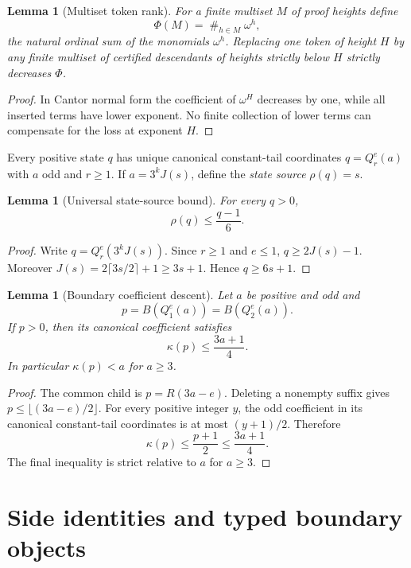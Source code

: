\documentclass[11pt]{article}
\newtheorem{lemma}[theorem]{Lemma}
\begin{document}
\begin{lemma}[Multiset token rank]\label{lem:token-rank}
For a finite multiset $M$ of proof heights define
\[
  \Phi(M)=\mathop{\#}_{h\in M}\omega^h,
\]
the natural ordinal sum of the monomials $\omega^h$. Replacing one token of
height $H$ by any finite multiset of certified descendants of heights strictly
below $H$ strictly decreases $\Phi$.
\end{lemma}

\begin{proof}
In Cantor normal form the coefficient of $\omega^H$ decreases by one, while
all inserted terms have lower exponent. No finite collection of lower terms
can compensate for the loss at exponent $H$.
\end{proof}

Every positive state $q$ has unique canonical constant-tail coordinates
$q=Q_r^e(a)$ with $a$ odd and $r\ge1$. If
$a=3^kJ(s)$, define the \emph{state source} $\rho(q)=s$.

\begin{lemma}[Universal state-source bound]\label{lem:source-bound}
For every $q>0$,
\[
  \rho(q)\le \frac{q-1}{6}.
\]
\end{lemma}

\begin{proof}
Write $q=Q_r^e(3^kJ(s))$. Since $r\ge1$ and $e\le1$,
$q\ge2J(s)-1$. Moreover
$J(s)=2\lceil3s/2\rceil+1\ge3s+1$. Hence
$q\ge6s+1$.
\end{proof}

\begin{lemma}[Boundary coefficient descent]\label{lem:boundary-coeff}
Let $a$ be positive and odd and
\[
 p=B(Q_1^e(a))=B(Q_2^e(a)).
\]
If $p>0$, then its canonical coefficient satisfies
\[
  \kappa(p)\le\frac{3a+1}{4}.
\]
In particular $\kappa(p)<a$ for $a\ge3$.
\end{lemma}

\begin{proof}
The common child is $p=R(3a-e)$. Deleting a nonempty suffix gives
$p\le\lfloor(3a-e)/2\rfloor$. For every positive integer $y$, the odd
coefficient in its canonical constant-tail coordinates is at most $(y+1)/2$.
Therefore
\[
 \kappa(p)\le\frac{p+1}{2}\le\frac{3a+1}{4}.
\]
The final inequality is strict relative to $a$ for $a\ge3$.
\end{proof}

\section{Side identities and typed boundary objects}
\end{document}

